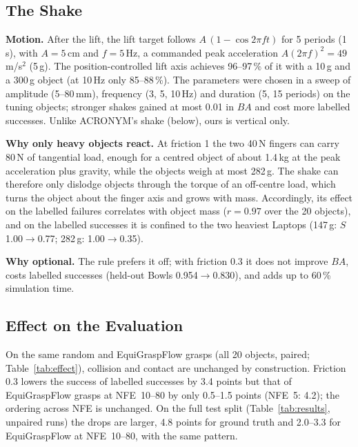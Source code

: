 \documentclass[conference]{IEEEtran}
\begin{document}
\subsection{The Shake}\label{app:shake}

\textbf{Motion.} After the lift, the lift target follows $A\,(1 - \cos 2\pi f t)$ for 5 periods
(1\,s), with $A = 5$\,cm and $f = 5$\,Hz, a commanded peak acceleration $A (2\pi f)^2 = 49$\,m/s$^2$
(5\,g). The position-controlled lift axis achieves 96--97\,\% of it with a 10\,g and a 300\,g object
(at 10\,Hz only 85--88\,\%). The parameters were chosen in a sweep of amplitude (5--80\,mm), frequency
(3, 5, 10\,Hz) and duration (5, 15 periods) on the tuning objects; stronger shakes gained at most 0.01 in
$\mathit{BA}$ and cost more labelled successes. Unlike ACRONYM's shake (below), ours is vertical only.

\textbf{Why only heavy objects react.} At friction 1 the two 40\,N fingers can carry 80\,N of
tangential load, enough for a centred object of about 1.4\,kg at the peak acceleration plus gravity, while the
objects weigh at most 282\,g. The shake can therefore only dislodge objects through the torque of an
off-centre load, which turns the object about the finger axis and grows with mass. Accordingly, its effect
on the labelled failures correlates with object mass ($r = 0.97$ over the 20 objects), and on the
labelled successes it is confined to the two heaviest Laptops (147\,g: $S$ 1.00$\to$0.77; 282\,g:
1.00$\to$0.35).

\textbf{Why optional.} The rule prefers it off; with friction 0.3 it does not improve $\mathit{BA}$,
costs labelled successes (held-out Bowls 0.954$\to$0.830), and adds up to 60\,\% simulation time.

\subsection{Effect on the Evaluation}\label{app:effect}

On the same random and EquiGraspFlow grasps (all 20 objects, paired; Table~\ref{tab:effect}), collision
and contact are unchanged by construction. Friction 0.3 lowers the success of labelled successes by
3.4 points but that of EquiGraspFlow grasps at NFE~10--80 by only 0.5--1.5 points (NFE~5: 4.2); the
ordering across NFE is unchanged. On the full test split (Table~\ref{tab:results}, unpaired runs) the drops
are larger, 4.8 points for ground truth and 2.0--3.3 for EquiGraspFlow at NFE~10--80, with the same
pattern.
\end{document}

